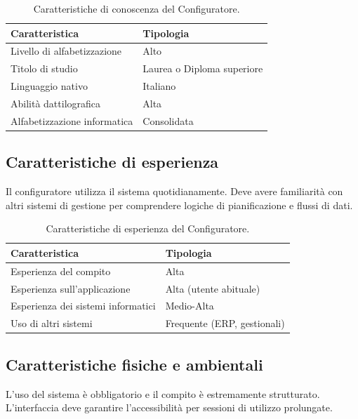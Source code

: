 \begin{table}[H]
\centering
\begin{tabular}{|l|l|}
\hline
\textbf{Caratteristica} & \textbf{Tipologia} \\ \hline
Livello di alfabetizzazione & Alto \\ \hline
Titolo di studio & Laurea o Diploma superiore \\ \hline
Linguaggio nativo & Italiano \\ \hline
Abilità dattilografica & Alta \\ \hline
Alfabetizzazione informatica & Consolidata \\ \hline
\end{tabular}
\caption{Caratteristiche di conoscenza del Configuratore.}
\label{tab:conf_conoscenza}
\end{table}

\subsection{Caratteristiche di esperienza}
Il configuratore utilizza il sistema quotidianamente. Deve avere familiarità con altri sistemi di gestione per comprendere logiche di pianificazione e flussi di dati.

\begin{table}[H]
\centering
\begin{tabular}{|l|l|}
\hline
\textbf{Caratteristica} & \textbf{Tipologia} \\ \hline
Esperienza del compito & Alta \\ \hline
Esperienza sull'applicazione & Alta (utente abituale) \\ \hline
Esperienza dei sistemi informatici & Medio-Alta \\ \hline
Uso di altri sistemi & Frequente (ERP, gestionali) \\ \hline
\end{tabular}
\caption{Caratteristiche di esperienza del Configuratore.}
\label{tab:conf_esperienza}
\end{table}

\subsection{Caratteristiche fisiche e ambientali}
L'uso del sistema è obbligatorio e il compito è estremamente strutturato. L'interfaccia deve garantire l'accessibilità per sessioni di utilizzo prolungate.

